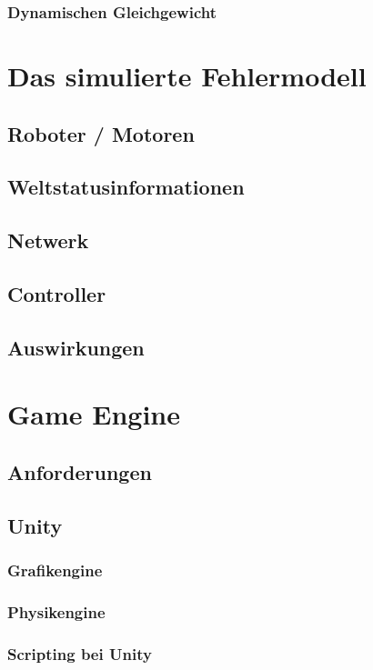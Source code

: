 \documentclass[ngerman]{scrartcl}
\begin{document}
\subsubsection{Dynamischen Gleichgewicht}
\section{Das simulierte Fehlermodell}\label{fm}
\subsection{Roboter / Motoren}
\subsection{Weltstatusinformationen}
\subsection{Netwerk}
\subsection{Controller}
\subsection{Auswirkungen}
\section{Game Engine}
\subsection{Anforderungen}
\subsection{Unity}
\subsubsection{Grafikengine}
\subsubsection{Physikengine}
\subsubsection{Scripting bei Unity}
\end{document}
